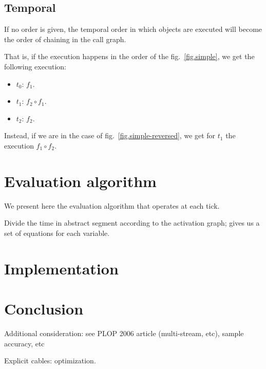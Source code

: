 \documentclass{article}
\begin{document}
    \subsection{Temporal}
    If no order is given, the temporal order in which objects are executed
    will become the order of chaining in the call graph.
    
    That is, if the execution happens in the order of the fig.~\ref{fig.simple}, we get the following execution: 
    
    \begin{itemize}
        \item $t_0$: $f_1$.
        \item $t_1$: $f_2 \circ f_1$.
        \item $t_2$: $f_2$. 
    \end{itemize}

    Instead, if we are in the case of fig.~\ref{fig.simple-reversed}, we get for $t_1$ the execution $f_1 \circ f_2$.
    
	\section{Evaluation algorithm}
    We present here the evaluation algorithm that operates at each tick.
    
    
	Divide the time in abstract segment according to the activation graph; gives us a set of equations for each variable.
	\section{Implementation}
    \section{Conclusion}
    Additional consideration: see PLOP 2006 article (multi-stream, etc), sample accuracy, etc
    
    Explicit cables: optimization.
\end{document}
